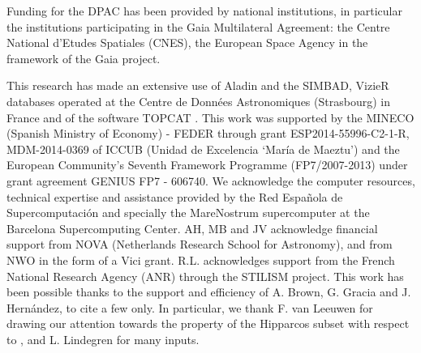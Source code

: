 \begin{acknowledgements}

Funding for the DPAC has been provided by national institutions, in
particular the institutions participating in the Gaia Multilateral Agreement: 
the Centre National d'Etudes Spatiales (CNES), 
the European Space Agency in the framework of the Gaia project.

This research has made an extensive use of Aladin and the SIMBAD, VizieR databases 
operated at the Centre de Donn\'ees 
Astronomiques (Strasbourg) in France 
and of the software TOPCAT \citep{2005ASPC..347...29T}.
This work was supported by the MINECO (Spanish Ministry of Economy) - FEDER through grant ESP2014-55996-C2-1-R,  MDM-2014-0369 of ICCUB (Unidad de Excelencia `Mar\'ia de Maeztu') and the European Community's Seventh Framework Programme (FP7/2007-2013) under grant agreement GENIUS FP7 - 606740.
We acknowledge the computer resources, technical expertise and assistance provided by the Red Espa\~nola de Supercomputaci\'on and specially the MareNostrum supercomputer at the Barcelona Supercomputing Center.
AH, MB and JV acknowledge financial support from NOVA (Netherlands Research School for Astronomy), and from NWO in the form of a Vici grant. R.L. acknowledges support from the French
National Research Agency (ANR) through the STILISM project.
This work has been possible thanks to the support and efficiency 
of A. Brown, G. Gracia and J. Hern\'andez, to cite a few only. In particular,
we thank F. van Leeuwen for drawing our attention towards the property of the 
Hipparcos subset with respect to ,
and L. Lindegren for many inputs. 
\end{acknowledgements}
